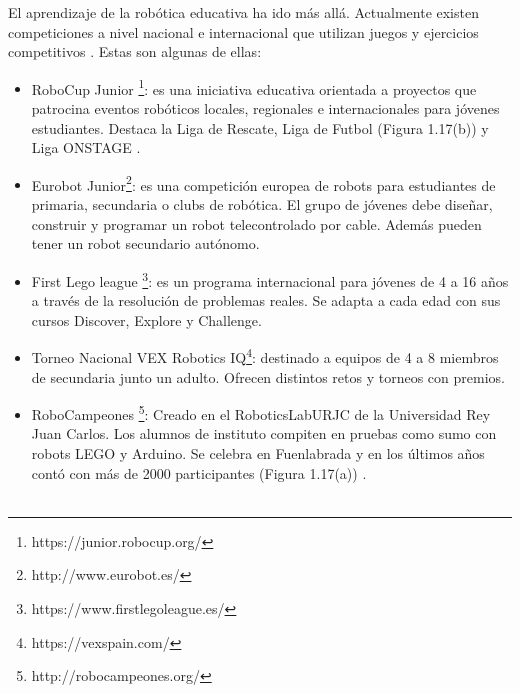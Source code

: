 El aprendizaje de la robótica educativa ha ido más allá. Actualmente existen competiciones a nivel nacional e internacional que utilizan juegos y ejercicios competitivos \cite{competiciones}. Estas son algunas de ellas:
\begin{itemize}
    \item RoboCup Junior \footnote{https://junior.robocup.org/}: es una iniciativa educativa orientada a proyectos que patrocina eventos robóticos locales, regionales e internacionales para jóvenes estudiantes. Destaca la Liga de Rescate, Liga de Futbol (Figura 1.17(b)) y Liga ONSTAGE \cite{robocup}.
 
    \item Eurobot Junior\footnote{http://www.eurobot.es/}: es una competición europea de robots para estudiantes de primaria, secundaria o clubs de robótica. El grupo de jóvenes debe diseñar, construir y programar un robot telecontrolado por cable. Además pueden tener un robot secundario autónomo\cite{eurobot}.
    
    \item First Lego league \footnote{https://www.firstlegoleague.es/}: es un programa internacional  para jóvenes de 4 a 16 años a través de la resolución de problemas reales. Se adapta a cada edad con sus cursos Discover, Explore y Challenge\cite{firstlego}.
    
    \item Torneo Nacional VEX Robotics IQ\footnote{https://vexspain.com/}: destinado a equipos de 4 a 8 miembros de secundaria junto un adulto. Ofrecen distintos retos y torneos con premios\cite{vex}.
    
    \item RoboCampeones \footnote{http://robocampeones.org/}: Creado en el RoboticsLabURJC de la Universidad Rey Juan Carlos. Los alumnos de instituto compiten en pruebas como sumo con robots LEGO y Arduino. Se celebra en Fuenlabrada y en los últimos años contó con más de 2000 participantes (Figura 1.17(a)) \cite{robocampeones}.
    \\
    \\
    

\end{itemize}

